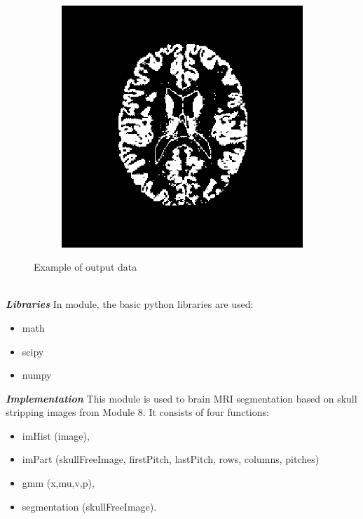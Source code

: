 \begin{figure}[H]
\begin{subfigure}[b]{0.25\linewidth}
	\end{subfigure}
	\begin{subfigure}[b]{0.25\linewidth}
		\includegraphics[width=\linewidth]{figures/Module_09/m09_10}
	\end{subfigure}
	\caption{Example of output data} 
	\label{fig:figures/m09_8910}
\end{figure} \\

\textbf{\textit{Libraries}}
In module, the basic python libraries are used:
\begin{itemize}
	\item math
	\item scipy 
	\item numpy
\end{itemize}

\textbf{\textit{Implementation}}
This module is used to brain MRI segmentation based on skull stripping images from Module 8. It consists of four functions:
\begin{itemize}
	\item imHist (image),
	\item imPart (skullFreeImage, firstPitch, lastPitch, rows, columns, pitches)
	\item gmm (x,mu,v,p),
	\item segmentation (skullFreeImage).
\end{itemize}


